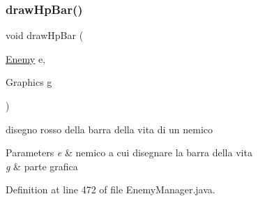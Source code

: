 \subsubsection{\texorpdfstring{draw\+Hp\+Bar()}{drawHpBar()}}
{\footnotesize\ttfamily void draw\+Hp\+Bar (\begin{DoxyParamCaption}\item[{\hyperlink{classenemies_1_1_enemy}{Enemy}}]{e,  }\item[{Graphics}]{g }\end{DoxyParamCaption})\hspace{0.3cm}{\ttfamily [private]}}



disegno rosso della barra della vita di un nemico 


\begin{DoxyParams}{Parameters}
{\em e} & nemico a cui disegnare la barra della vita \\
\hline
{\em g} & parte grafica \\
\hline
\end{DoxyParams}


Definition at line 472 of file Enemy\+Manager.\+java.

